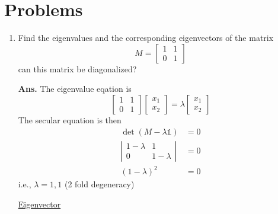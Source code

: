 	\section{Problems}
	\begin{enumerate}
		\item Find the eigenvalues and the corresponding eigenvectors of the matrix
		\begin{equation}
			M = \left[\begin{matrix}
			1 & 1 \\ 0 & 1
			\end{matrix}\right]
		\end{equation}
		can this matrix be diagonalized?
		
		
		\textbf{Ans.}\newline
		The eigenvalue eqation is
		\begin{equation}
		\left[
			\begin{matrix}
				1 & 1 \\ 0 & 1
			\end{matrix}
			\right]
			\left[\begin{matrix}
			x_1 \\ x_2
			\end{matrix}\right] 
			= 
			\lambda 
			\left[\begin{matrix}
			x_1 \\ x_2
			\end{matrix}\right]
		\end{equation}
		The secular equation is then 
		\begin{eqnarray}
			\det(M - \lambda \mathbb{1}) &= 0 \nonumber\\
			\left|\begin{matrix}
			1-\lambda & 1 \\ 0 & 1-\lambda
			\end{matrix}\right| &=0 \nonumber \\
			\left(1-\lambda\right)^2 &= 0 \nonumber
		\end{eqnarray}
		i.e., $\lambda = 1,1$ (2 fold degeneracy)
		
		\underline{Eigenvector}
		

\end{enumerate}
